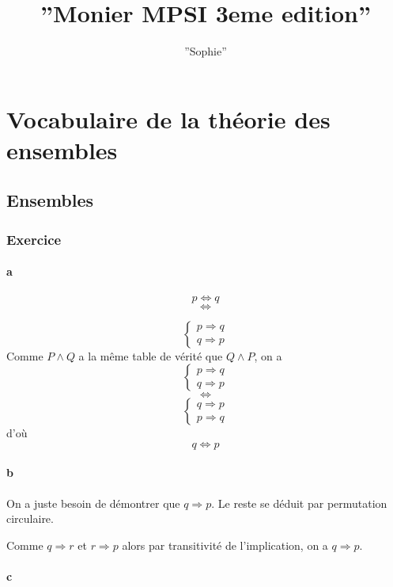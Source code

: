 \documentclass{book}
\title{''Monier MPSI 3eme edition''}
\author{''Sophie''}
\begin{document}
 

 \chapter{Vocabulaire de la théorie des ensembles}
\section{Ensembles}
 \subsection{Exercice}
\subsubsection{a}
 \[p\Longleftrightarrow q\]
\[\Longleftrightarrow\]


\[
\left \{
\begin{array}{c}
     p \Longrightarrow q \\
    q \Longrightarrow p
\end{array}
\right.
\]
Comme \(P \land Q \) a la même table de vérité que \(Q \land P\), on a 
 \[
\left \{
\begin{array}{c}
     p \Longrightarrow q \\
    q \Longrightarrow p
\end{array}
\right.
\]
\[\Longleftrightarrow\]
 \[
\left \{
\begin{array}{c}
     q \Longrightarrow p \\
    p \Longrightarrow q
\end{array}
\right.
\]
d'où
\[q \Longleftrightarrow p\]
\subsubsection{b}
On a juste besoin de démontrer que \(q\Longrightarrow p\). Le reste se déduit par permutation circulaire.

Comme \(q\Longrightarrow r\) et \(r \Longrightarrow p\) alors par transitivité de l'implication, on a \(q\Longrightarrow p\).
\subsubsection{c}


 
\end{document}
